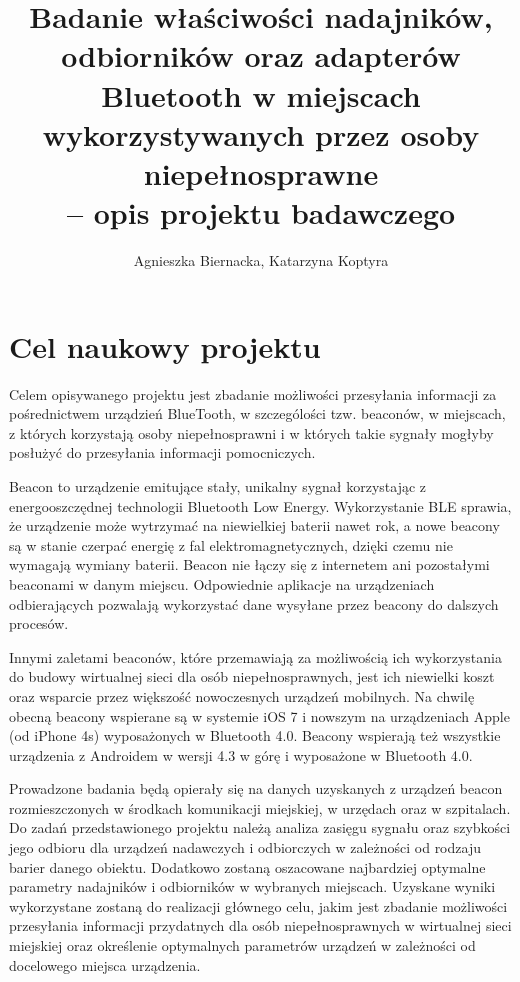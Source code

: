 \documentclass[a4paper]{article}
\begin{document}
\title{Badanie właściwości nadajników, odbiorników oraz adapterów Bluetooth w miejscach wykorzystywanych przez osoby niepełnosprawne \\-- opis projektu badawczego}
\author{Agnieszka Biernacka, Katarzyna Koptyra}
\maketitle

\section{Cel naukowy projektu}
Celem opisywanego projektu jest zbadanie możliwości przesyłania informacji za pośrednictwem urządzień BlueTooth, w szczególości tzw. beaconów, w miejscach, z których korzystają osoby niepełnosprawni i w których takie sygnały mogłyby posłużyć do przesyłania informacji pomocniczych. 

Beacon to urządzenie emitujące stały, unikalny sygnał korzystając z energooszczędnej technologii Bluetooth Low Energy. Wykorzystanie BLE sprawia, że urządzenie może wytrzymać na niewielkiej baterii nawet rok, a nowe beacony są w stanie czerpać energię z fal elektromagnetycznych, dzięki czemu nie wymagają wymiany baterii.
Beacon nie łączy się z internetem ani pozostałymi beaconami w danym miejscu. Odpowiednie aplikacje na urządzeniach odbierających  pozwalają wykorzystać dane wysyłane przez beacony do dalszych procesów.

Innymi zaletami beaconów, które przemawiają za możliwością ich wykorzystania do budowy wirtualnej sieci dla osób niepełnosprawnych, jest ich niewielki koszt oraz wsparcie przez większość nowoczesnych urządzeń mobilnych. Na chwilę obecną beacony wspierane są w systemie iOS 7 i nowszym na urządzeniach Apple (od iPhone 4s) wyposażonych w Bluetooth 4.0. Beacony wspierają też wszystkie urządzenia z Androidem w wersji 4.3 w górę i wyposażone w Bluetooth 4.0.

Prowadzone badania będą opierały się na danych uzyskanych z urządzeń beacon rozmieszczonych w środkach komunikacji miejskiej, w urzędach oraz w szpitalach. Do zadań przedstawionego projektu należą analiza zasięgu sygnału oraz szybkości jego odbioru dla urządzeń nadawczych i odbiorczych w zależności od rodzaju barier danego obiektu. Dodatkowo zostaną oszacowane najbardziej optymalne parametry nadajników i odbiorników w wybranych miejscach. Uzyskane wyniki wykorzystane zostaną do realizacji głównego celu, jakim jest zbadanie możliwości przesyłania informacji przydatnych dla osób niepełnosprawnych w wirtualnej sieci miejskiej oraz  określenie optymalnych parametrów urządzeń w zależności od docelowego miejsca urządzenia.
\end{document}
